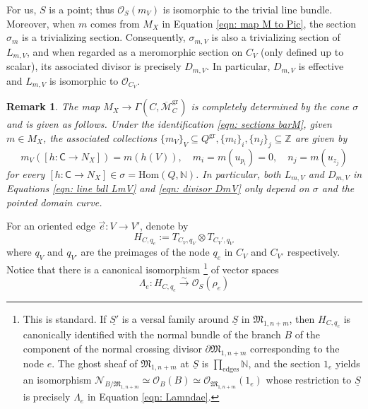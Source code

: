\documentclass{article}
\def\N{{\mathbb{N}}}
\def\cO{\mathcal{O}}
\def\oM{\overline{\mathcal{M}}}
\def\Z{\mathbb{Z}}
\newtheorem{remark}[definition]{Remark}
\newcommand{\gr}{\mathrm{gr}}
\begin{document}
For us, $S$ is a point; thus $\mathcal{O}_S(m_V)$ is isomorphic to the trivial line bundle. Moreover, when $m$ comes from $M_X$ in Equation \eqref{eqn: map M to Pic}, the section $\sigma_m$ is a trivializing section. Consequently, $\sigma_{m,V}$ is also a trivializing section of $L_{m,V}$, and when regarded as a meromorphic section on $C_V$ (only defined up to scalar), its associated divisor is precisely $D_{m,V}$. In particular, $D_{m,V}$ is effective and $L_{m,V}$ is isomorphic to $\cO_{C_V}$.

\begin{remark}\label{rmk: computation_mV,mi,nj}
    The map $M_X \to \Gamma(C,\oM_C^{\gr})$ is completely determined by the cone $\sigma$ and is given as follows. Under the identification \eqref{eqn: sections barM}, given $m \in M_X$, the associated collections $\{m_V\}_V \subseteq Q^{\gr}, \{m_i\}_i , \{n_j\}_j\subseteq \Z$ are given by
    \begin{equation}\label{eqn: section m on C}
        m_V([h \colon \mathsf{C} \to N_X]) = m(h(V)), \quad m_i = m(u_{p_i})=0,  \quad n_j=m(u_{z_j})
    \end{equation}
    for every $[h \colon \mathsf{C} \to N_X] \in \sigma= \mathrm{Hom}(Q,\N)$. In particular, both $L_{m,V}$ and $D_{m,V}$ in Equations \eqref{eqn: line bdl LmV} and \eqref{eqn: divisor DmV} only depend on $\sigma$ and the pointed domain curve.
\end{remark}

For an oriented edge $\vec{e}: V \to V'$, denote by
$$
H_{C,q_e} := T_{C_V, q_{V}} \otimes 
T_{C_V',q_{V'}}$$
where $q_{V}$ and $q_{V'}$ are the preimages of the node $q_e$ in $C_V$ and $C_{V'}$ respectively. Notice that there is a canonical isomorphism \footnote{This is standard. If $\underline{S'}$ is a versal family around $\underline{S}$ in $\mathfrak{M}_{1,n+m}$, then $H_{C,q_e}$ is canonically identified with the normal bundle of the branch $B$ of the component of the normal crossing divisor $\partial \mathfrak{M}_{1,n+m}$ corresponding to the node $e$. The ghost sheaf of $\mathfrak{M}_{1,n+m}$ at $\underline{S}$ is $\prod_{\mathrm{edges}} \mathbb{N}$, and the section $1_e$ yields an isomorphism $\mathcal{N}_{B/\mathfrak{M}_{1,n+m}} \simeq \cO_B(B) \simeq \mathcal{O}_{\mathfrak{M}_{1,n+m}}(1_e)$ whose restriction to $\underline{S}$ is precisely $\Lambda_e$ in Equation \eqref{eqn: Lamndae}.} of vector spaces
\begin{equation}\label{eqn: Lamndae}
\Lambda_e: H_{C,q_e} \xrightarrow{\sim} \cO_{S}(\rho_e)
\end{equation}
\end{document}
